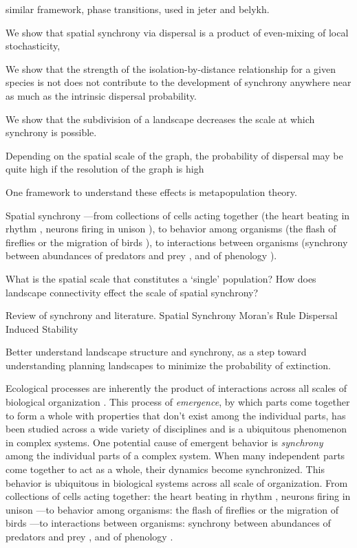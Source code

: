 \documentclass[]{article}
\begin{document}
similar framework, phase transitions, used in jeter and belykh.




We show that spatial synchrony via dispersal is a product of even-mixing of local stochasticity,

We show that the strength of the isolation-by-distance relationship for a given species is not does not contribute to the development of synchrony anywhere near as much as the intrinsic dispersal probability.

We show that the subdivision of a landscape decreases the scale at which synchrony is possible.


Depending on the spatial scale of the graph, the probability of dispersal may be quite high if the resolution of the graph is high



One framework to understand these effects is metapopulation theory.


Spatial synchrony
---from collections of cells acting together (the heart beating in rhythm \cite{womelsdorf_modulation_2007}, neurons firing in unison \cite{strogatz_sync_2003}), to behavior among organisms (the flash of fireflies \cite{otte_theories_1980} or the migration of birds \cite{spottiswoode_extrapair_2004}), to interactions between organisms (synchrony between abundances of predators and prey \cite{lv}, and of phenology \cite{van_asch_phenology_2007,burkle_future_2011}).


What is the spatial scale that constitutes a `single' population?
How does landscape connectivity effect the scale of spatial synchrony?

Review of synchrony and literature.
  Spatial Synchrony
  Moran's Rule
  Dispersal Induced Stability

Better understand landscape structure and synchrony, as a step toward understanding
planning landscapes to minimize the probability of extinction.





Ecological processes are inherently the product of interactions across all scales of biological organization \cite{levin_problem_1992}. This process of \textit{emergence}, by which parts come together to form a whole with properties that don't exist among the individual parts, has been studied across a wide variety of disciplines \cite{manrubia_emergence_2004} and is a ubiquitous phenomenon in complex systems. One potential cause of emergent behavior is \textit{synchrony} among the individual parts of a complex system. When many independent parts come together to act as a whole, their dynamics become synchronized.
This behavior is ubiquitous in biological systems across all scale of organization.
From collections of cells acting together: the heart beating in rhythm \cite{womelsdorf_modulation_2007}, neurons firing in unison \cite{strogatz_sync_2003}---to behavior among organisms: the flash of fireflies \cite{otte_theories_1980} or the migration of birds \cite{spottiswoode_extrapair_2004}---to interactions between organisms: synchrony between abundances of predators and prey \cite{lv}, and of phenology \cite{van_asch_phenology_2007,burkle_future_2011}.
\end{document}
